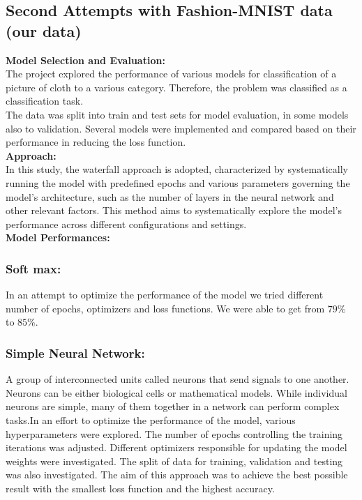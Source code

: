 \documentclass{article}
\begin{document}
\subsection{Second Attempts with Fashion-MNIST data (our data)}
\textbf{Model Selection and Evaluation:}\\
The project explored the performance of various models for classification of a picture of cloth to a various category. Therefore, the problem was classified as a classification task.\\
The data was split into train and test sets for model evaluation, in some models also to validation. Several models were implemented and compared based on their performance in reducing the loss function.\\\newline
\textbf{Approach:}\\
In this study, the waterfall approach is adopted, characterized by systematically running the model with predefined epochs and various parameters governing the model's architecture, such as the number of layers in the neural network and other relevant factors. This method aims to systematically explore the model's performance across different configurations and settings.\\
\textbf{Model Performances:}\\

\subsubsection{Soft max:}
In an attempt to optimize the performance of the model we tried different number of epochs, optimizers and loss functions. We were able to get from ${79\%}$ to ${85\%}$.\\

\subsubsection{Simple Neural Network:}
A group of interconnected units called neurons that send signals to one another. Neurons can be either biological cells or mathematical models. While individual neurons are simple, many of them together in a network can perform complex tasks.In an effort to optimize the performance of the model, various hyperparameters were explored.
The number of epochs controlling the training iterations was adjusted. Different optimizers responsible for updating the model weights were investigated. The split of data for training, validation and testing was also investigated.
The aim of this approach was to achieve the best possible result with the smallest loss function and the highest accuracy.
\end{document}

